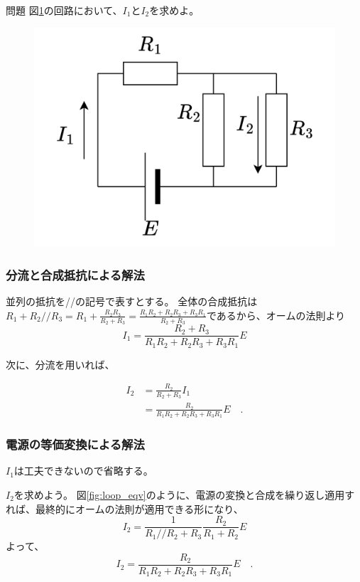 \documentclass{ltjsreport}
\newcommand{\para}[2]{\frac{#1 #2}{#1 + #2}}
\newcommand{\paral}{/\!/}
\begin{document}
\begin{itembox}[l]{問題}
図\ref{fig:loop_re}の回路において、$I_1$と$I_2$を求めよ。
\begin{figure}[H]
  \centering
  \includegraphics[keepaspectratio, scale=0.07]
       {img/loop_re.drawio.png}
  \caption{}
  \label{fig:loop_re}
 \end{figure}

\end{itembox}

\subsubsection{分流と合成抵抗による解法}
並列の抵抗を\paral の記号で表すとする。
全体の合成抵抗は $R_1+R_2\paral R_3 = R_1+\para{R_2}{R_3} = \frac{R_1R_2+R_2R_3+R_3R_1}{R_2+R_3}$であるから、オームの法則より
\[
  I_1 = \frac{R_2+R_3}{R_1R_2+R_2R_3+R_3R_1}E
\]

次に、分流を用いれば、

\begin{align}
  I_2 &= \frac{R_2}{R_2+R_3} I_1\\
  &= \frac{R_2}{R_1R_2+R_2R_3+R_3R_1}E \quad .
\end{align}



\subsubsection{電源の等価変換による解法}
$I_1$は工夫できないので省略する。

$I_2$を求めよう。
図\ref{fig:loop_eqv}のように、電源の変換と合成を繰り返し適用すれば、最終的にオームの法則が適用できる形になり、
\[
  I_2 = \frac{1}{R_1 \paral R_2 + R_3} \frac{R_2}{R_1+R_2}E
\]
よって、
\[
  I_2 = \frac{R_2}{R_1R_2+R_2R_3+R_3R_1}E \quad .
  \]
\end{document}
